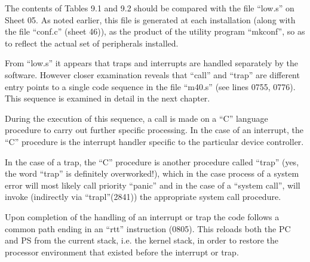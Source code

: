 The contents of Tables 9.1 and 9.2
should be compared with the file
``low.s'' on Sheet 05. As noted earlier,
this file is generated at each installation (along with the file ``conf.c''
(sheet 46)), as the product of the
utility program ``mkconf'', so as to
reflect the actual set of peripherals
installed.



From ``low.s'' it appears that traps and
interrupts are handled separately by
the software. However closer examination reveals that ``call'' and ``trap'' are
different entry points to a single code
sequence in the file ``m40.s'' (see lines
0755, 0776). This sequence is examined
in detail in the next chapter.


During the execution of this sequence,
a call is made on a ``C'' language procedure to carry out further specific
processing. In the case of an interrupt, the ``C'' procedure
is the interrupt handler specific to the particular
device controller.

 In the case of a trap, the ``C'' procedure is another procedure called
 ``trap'' (yes, the word ``trap'' is definitely overworked!), which in the case
process of a system error will most likely call
priority ``panic'' and in the case of a ``system
 call'', will invoke (indirectly via
 ``trapl''(2841)) the appropriate system
 call procedure.


Upon completion of the handling of an
interrupt or trap the code follows a
common path ending in an ``rtt'' instruction (0805). This reloads both the PC
and PS from the current stack, i.e. the
kernel stack, in order to restore the
processor environment that existed
before the interrupt or trap.

